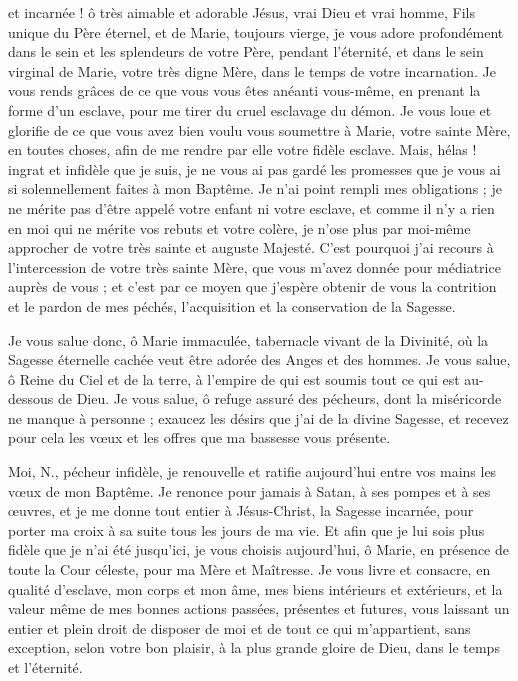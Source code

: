  et incarnée ! ô très aimable et adorable Jésus, vrai Dieu et vrai homme, Fils unique du Père éternel, et de Marie, toujours vierge, je vous adore profondément dans le sein et les splendeurs de votre Père, pendant l’éternité, et dans le sein virginal de Marie, votre très digne Mère, dans le temps de votre incarnation. Je vous rends grâces de ce que vous vous êtes anéanti vous-même, en prenant la forme d’un esclave, pour me tirer du cruel esclavage du démon. Je vous loue et glorifie de ce que vous avez bien voulu vous soumettre à Marie, votre sainte Mère, en toutes choses, afin de me rendre par elle votre fidèle esclave. Mais, hélas ! ingrat et infidèle que je suis, je ne vous ai pas gardé les promesses que je vous ai si solennellement faites à mon Baptême. Je n’ai point rempli mes obligations ; je ne mérite pas d’être appelé votre enfant ni votre esclave, et comme il n’y a rien en moi qui ne mérite vos rebuts et votre colère, je n’ose plus par moi-même approcher de votre très sainte et auguste Majesté. C’est pourquoi j’ai recours à l’intercession de votre très sainte Mère, que vous m’avez donnée pour médiatrice auprès de vous ; et c’est par ce moyen que j’espère obtenir de vous la contrition et le pardon de mes péchés, l’acquisition et la conservation de la Sagesse.

Je vous salue donc, ô Marie immaculée, tabernacle vivant de la Divinité, où la Sagesse éternelle cachée veut être adorée des Anges et des hommes. Je vous salue, ô Reine du Ciel et de la terre, à l’empire de qui est soumis tout ce qui est au-dessous de Dieu. Je vous salue, ô refuge assuré des pécheurs, dont la miséricorde ne manque à personne ; exaucez les désirs que j’ai de la divine Sagesse, et recevez pour cela les vœux et les offres que ma bassesse vous présente.

Moi, N., pécheur infidèle, je renouvelle et ratifie aujourd’hui entre vos mains les vœux de mon Baptême. Je renonce pour jamais à Satan, à ses pompes et à ses œuvres, et je me donne tout entier à Jésus-Christ, la Sagesse incarnée, pour porter ma croix à sa suite tous les jours de ma vie. Et afin que je lui sois plus fidèle que je n’ai été jusqu’ici, je vous choisis aujourd’hui, ô Marie, en présence de toute la Cour céleste, pour ma Mère et Maîtresse. Je vous livre et consacre, en qualité d’esclave, mon corps et mon âme, mes biens intérieurs et extérieurs, et la valeur même de mes bonnes actions passées, présentes et futures, vous laissant un entier et plein droit de disposer de moi et de tout ce qui m’appartient, sans exception, selon votre bon plaisir, à la plus grande gloire de Dieu, dans le temps et l’éternité.

